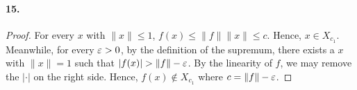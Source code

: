   \paragraph{15.}
  \begin{proof}
    For every $x$ with $\|x\|\le 1$, $f(x)\le \|f\|\|x\|\le c$. Hence, $x\in 
    X_{c_1}$. Meanwhile, for every $\varepsilon>0$, by the definition of the supremum,
    there exists a $x$ with $\|x\|=1$ such that $|f(x)|>\|f\|-\vep$. By the 
    linearity of $f$, we may remove the $|\cdot|$ on the right side. Hence, 
    $f(x)\notin X_{c_1}$ where $c=\|f\|-\varepsilon$.
  \end{proof}
